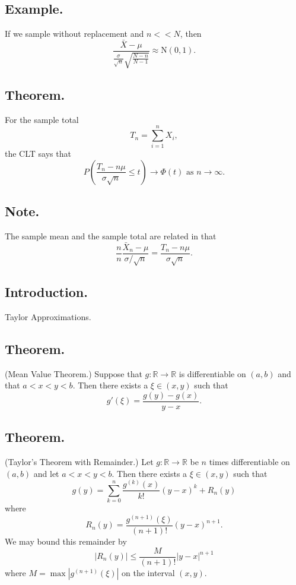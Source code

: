 \documentclass[titlepage]{article}
\begin{document}
\subsection{Example.} If we sample without replacement and $n << N$, then 
$$\frac{\bar{X} - \mu}{\frac{\sigma}{\sqrt{n}}\sqrt{\frac{N-n}{N-1}}} \approx \text{N}(0, 1).$$

\subsection{Theorem.} For the sample total 
$$T_{n} = \sum_{i=1}^{n}X_{i},$$
the CLT says that 
$$P\left(\frac{T_{n} - n\mu}{\sigma\sqrt{n}} \leq t\right) \rightarrow \Phi(t) \text{ as } n \rightarrow \infty.$$

\subsection{Note.} The sample mean and the sample total are related in that 
$$\frac{n}{n}\frac{\bar{X}_{n}-\mu}{\sigma/\sqrt{n}} = \frac{T_{n}-n\mu}{\sigma\sqrt{n}}.$$

\newpage {}

\subsection{Introduction.} Taylor Approximations.

\subsection{Theorem.} (Mean Value Theorem.) Suppose that $g: \mathbb{R} \to \mathbb{R}$ is differentiable on $(a, b)$ and that $a < x < y < b$. Then there exists a $\xi \in (x, y)$ such that 
$$g'(\xi) = \frac{g(y) - g(x)}{y - x}.$$

\subsection{Theorem.} (Taylor's Theorem with Remainder.) 
Let $g: \mathbb{R} \to \mathbb{R}$ be $n$ times differentiable on $(a, b)$ and let $a < x < y < b$. Then there exists a $\xi \in (x, y)$ such that 
$$g(y) = \sum_{k=0}^{n}\frac{g^{(k)}(x)}{k!}(y-x)^{k} + R_{n}(y)$$
where
$$R_{n}(y) = \frac{g^{(n+1)}(\xi)}{(n+1)!}(y-x)^{n+1}.$$
We may bound this remainder by 
$$|R_{n}(y)| \leq \frac{M}{(n+1)!}|y-x|^{n+1}$$
where $M = \max|g^{(n+1)}(\xi)|$ on the interval $(x, y)$.
\end{document}
